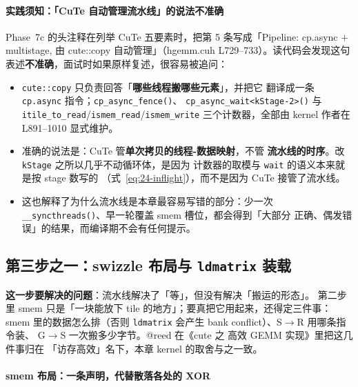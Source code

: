\paragraph{实践须知：「CuTe 自动管理流水线」的说法不准确}

Phase~7c 的头注释在列举 CuTe 五要素时，把第 5 条写成「Pipeline: cp.async $+$
multistage, 由 cute::copy 自动管理」（hgemm.cuh L729--733）。读代码会发现这句
表述\textbf{不准确}，面试时如果原样复述，很容易被追问：

\begin{itemize}
  \item \texttt{cute::copy} 只负责回答「\textbf{哪些线程搬哪些元素}」，并把它
        翻译成一条 \texttt{cp.async} 指令；\texttt{cp\_\allowbreak{}async\_\allowbreak{}fence\allowbreak{}()}、
        \texttt{cp\_\allowbreak{}async\_\allowbreak{}wait\allowbreak{}<k\allowbreak{}Stage-2>\allowbreak{}()} 与
        \texttt{itile\_\allowbreak{}to\_\allowbreak{}read}/\texttt{ismem\_read}/\texttt{ismem\_write}
        三个计数器，全部由 kernel 作者在 L891--1010 显式维护。
  \item 准确的说法是：CuTe 管\textbf{单次拷贝的线程-数据映射}，不管
        \textbf{流水线的时序}。改 \texttt{kStage} 之所以几乎不动循环体，是因为
        计数器的取模与 \texttt{wait} 的语义本来就是按 stage 数写的
        （式~\eqref{eq:24-inflight}），而不是因为 CuTe 接管了流水线。
  \item 这也解释了为什么流水线是本章最容易写错的部分：少一次
        \texttt{\_\allowbreak{}\_\allowbreak{}syncthreads\allowbreak{}()}、早一轮覆盖 smem 槽位，都会得到「大部分
        正确、偶发错误」的结果，而编译期不会有任何提示。
\end{itemize}

\subsection{第三步之一：swizzle 布局与 \texttt{ldmatrix} 装载}\label{sec:24-step3a}

\textbf{这一步要解决的问题}：流水线解决了「等」，但没有解决「搬运的形态」。
第二步里 smem 只是「一块能放下 tile 的地方」；要真把它用起来，还得定三件事：
smem 里的数据怎么排（否则 \texttt{ldmatrix} 会产生 bank conflict）、S$\to$R 用哪条指令装、
G$\to$S 一次搬多少字节。@reed 在《cute 之 高效 GEMM 实现》里把这几件事归在
「访存高效」名下，本章 kernel 的取舍与之一致。

\paragraph{smem 布局：一条声明，代替散落各处的 XOR}

